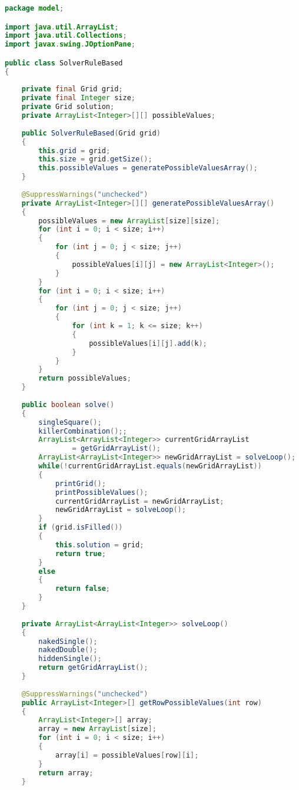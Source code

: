 \begin{lstlisting}[language=Java,basicstyle=\tiny,caption=SolverRuleBased.java]
package model;

import java.util.ArrayList;
import java.util.Collections;
import javax.swing.JOptionPane;

public class SolverRuleBased
{
    
    private final Grid grid;
    private final Integer size;
    private Grid solution;
    private ArrayList<Integer>[][] possibleValues;
    
    public SolverRuleBased(Grid grid)
    {
        this.grid = grid;
        this.size = grid.getSize();
        this.possibleValues = generatePossibleValuesArray();
    }
    
    @SuppressWarnings("unchecked")
	private ArrayList<Integer>[][] generatePossibleValuesArray()
    {
        possibleValues = new ArrayList[size][size];
        for (int i = 0; i < size; i++)
        {
            for (int j = 0; j < size; j++)
            {
                possibleValues[i][j] = new ArrayList<Integer>();
            }
        }
        for (int i = 0; i < size; i++)
        {
            for (int j = 0; j < size; j++)
            {
                for (int k = 1; k <= size; k++)
                {
                    possibleValues[i][j].add(k);
                }
            }
        }
        return possibleValues;
    }
    
    public boolean solve()
    {
        singleSquare();
        killerCombination();;
        ArrayList<ArrayList<Integer>> currentGridArrayList 
                = getGridArrayList();
        ArrayList<ArrayList<Integer>> newGridArrayList = solveLoop();
        while(!currentGridArrayList.equals(newGridArrayList))
        {
            printGrid();
            printPossibleValues();
            currentGridArrayList = newGridArrayList;
            newGridArrayList = solveLoop();
        }
        if (grid.isFilled())
        {
            this.solution = grid;
            return true;
        }
        else
        {
            return false;
        }
    }
    
    private ArrayList<ArrayList<Integer>> solveLoop()
    {
        nakedSingle();
        nakedDouble();
        hiddenSingle();
        return getGridArrayList();
    }
    
    @SuppressWarnings("unchecked")
	public ArrayList<Integer>[] getRowPossibleValues(int row)
    {
        ArrayList<Integer>[] array;
        array = new ArrayList[size];
        for (int i = 0; i < size; i++)
        {
            array[i] = possibleValues[row][i];
        }
        return array;
    }
    

\end{lstlisting}

